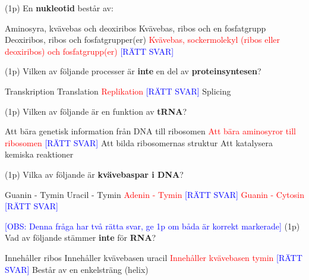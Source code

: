 \documentclass{exam}
\begin{document}
\vspace{5mm}
\begin{center}
\end{center}
\vspace{5mm}
\begin{questions}

\question (1p) En \textbf{nukleotid} består av:
\begin{checkboxes}
   \choice Aminosyra, kvävebas och deoxiribos
   \choice Kvävebas, ribos och en fosfatgrupp
   \choice Deoxiribos, ribos och fosfatgrupper(er)
   \correctchoice \textcolor{red}{Kvävebas, sockermolekyl (ribos eller deoxiribos) och fosfatgrupp(er)} \textcolor{blue}{[RÄTT SVAR]}
\end{checkboxes}
\vspace{5mm}

\question (1p) Vilken av följande processer är \textbf{inte} en del av \textbf{proteinsyntesen}?
\begin{checkboxes}
    \choice Transkription
    \choice Translation
    \correctchoice \textcolor{red}{Replikation} \textcolor{blue}{[RÄTT SVAR]}
    \choice Splicing
\end{checkboxes}
\vspace{5mm}

\question (1p) Vilken av följande är en funktion av \textbf{tRNA}?
\begin{checkboxes}
\choice Att bära genetisk information från DNA till ribosomen
\correctchoice \textcolor{red}{Att bära aminosyror till ribosomen} \textcolor{blue}{[RÄTT SVAR]}
\choice Att bilda ribosomernas struktur
\choice Att katalysera kemiska reaktioner
\end{checkboxes}
\vspace{5mm}

\question (1p) Vilka av följande är \textbf{kvävebaspar i DNA}?
\begin{checkboxes}
   \choice Guanin - Tymin
   \choice Uracil - Tymin
   \correctchoice \textcolor{red}{Adenin - Tymin} \textcolor{blue}{[RÄTT SVAR]}
   \correctchoice \textcolor{red}{Guanin - Cytosin} \textcolor{blue}{[RÄTT SVAR]}
\end{checkboxes}
\textcolor{blue}{[OBS: Denna fråga har två rätta svar, ge 1p om båda är korrekt markerade]}
\vspace{5mm}
\break
\question (1p) Vad av följande stämmer \textbf{inte} för \textbf{RNA}?
\begin{checkboxes}
   \choice Innehåller ribos
   \choice Innehåller kvävebasen uracil
   \correctchoice \textcolor{red}{Innehåller kvävebasen tymin} \textcolor{blue}{[RÄTT SVAR]}
   \choice Består av en enkelsträng (helix)
\end{checkboxes}
\vspace{5mm}


\end{questions}
\end{document}
